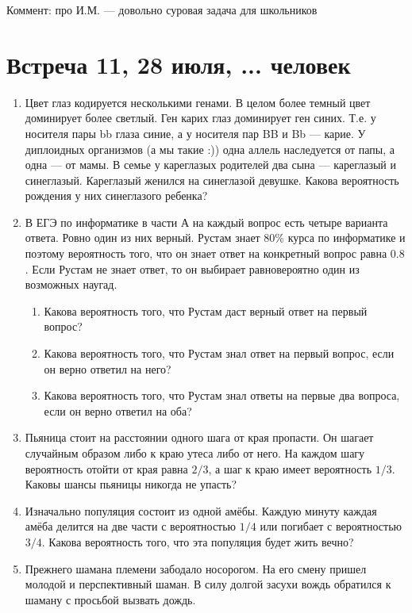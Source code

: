 \documentclass[pdftex,12pt,a4paper]{article}
\begin{document}
Коммент: про И.М. --- довольно суровая задача для школьников

\newpage
\section{Встреча 11, 28 июля, ... человек}

\begin{enumerate}

\item Цвет глаз кодируется несколькими генами. В целом более темный цвет доминирует более светлый. Ген карих глаз доминирует ген синих. Т.е. у носителя пары bb глаза
синие, а у носителя пар BB и Bb --- карие. У диплоидных организмов
(а мы такие :)) одна аллель наследуется от папы, а одна --- от мамы.
В семье у кареглазых родителей два сына --- кареглазый и синеглазый.
Кареглазый женился на синеглазой девушке. Какова вероятность
рождения у них синеглазого ребенка?

\item В ЕГЭ по информатике в части А на каждый вопрос есть четыре варианта ответа. Ровно один из них верный. Рустам знает 80\% курса по информатике и поэтому вероятность того, что он знает ответ на конкретный вопрос равна $0.8$. Если Рустам не знает ответ, то он выбирает равновероятно один из возможных наугад. 
\begin{enumerate}
\item Какова вероятность того, что Рустам даст верный ответ на первый вопрос?
\item Какова вероятность того, что Рустам знал ответ на первый вопрос, если он верно ответил на него?
\item Какова вероятность того, что Рустам знал ответы на первые два вопроса, если он верно ответил на оба?
\end{enumerate}

\item Пьяница стоит на расстоянии одного шага от края пропасти. Он
шагает случайным образом либо к краю утеса либо от него. На каждом
шагу вероятность отойти от края равна $2/3$, а шаг к краю имеет
вероятность $1/3$. Каковы шансы пьяницы никогда не упасть?

\item Изначально популяция состоит из одной амёбы. Каждую минуту каждая амёба делится на две части с вероятностью $1/4$ или погибает с вероятностью $3/4$. Какова вероятность того, что эта популяция будет жить вечно?

\item Прежнего шамана племени забодало носорогом. На его смену пришел молодой и перспективный шаман. В силу долгой засухи вождь обратился к шаману с просьбой вызвать дождь. 


\end{enumerate}
\end{document}
